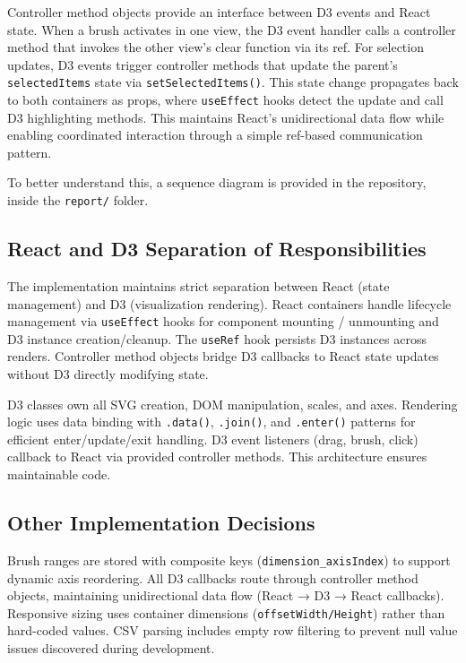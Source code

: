 \documentclass[10pt,a4paper]{article}
\begin{document}
Controller method objects provide an interface between D3 events and React state. When a brush activates in one view, the D3 event handler calls a controller method that invokes the other view's clear function via its ref. For selection updates, D3 events trigger controller methods that update the parent's \texttt{selectedItems} state via \texttt{setSelectedItems()}. This state change propagates back to both containers as props, where \texttt{useEffect} hooks detect the update and call D3 highlighting methods. This maintains React's unidirectional data flow while enabling coordinated interaction through a simple ref-based communication pattern.

To better understand this, a sequence diagram is provided in the repository, inside the \texttt{report/} folder.


\subsection{React and D3 Separation of Responsibilities}

The implementation maintains strict separation between React (state management) and D3 (visualization rendering). React containers handle lifecycle management via \texttt{useEffect} hooks for component mounting / unmounting and D3 instance creation/cleanup. The \texttt{useRef} hook persists D3 instances across renders. Controller method objects bridge D3 callbacks to React state updates without D3 directly modifying state.

D3 classes own all SVG creation, DOM manipulation, scales, and axes. Rendering logic uses data binding with \texttt{.data()}, \texttt{.join()}, and \texttt{.enter()} patterns for efficient enter/update/exit handling. D3 event listeners (drag, brush, click) callback to React via provided controller methods. This architecture ensures maintainable code.

\subsection{Other Implementation Decisions}

Brush ranges are stored with composite keys (\texttt{dimension\_axisIndex}) to support dynamic axis reordering. All D3 callbacks route through controller method objects, maintaining unidirectional data flow (React → D3 → React callbacks). Responsive sizing uses container dimensions (\texttt{offsetWidth/Height}) rather than hard-coded values. CSV parsing includes empty row filtering to prevent null value issues discovered during development.
\end{document}
